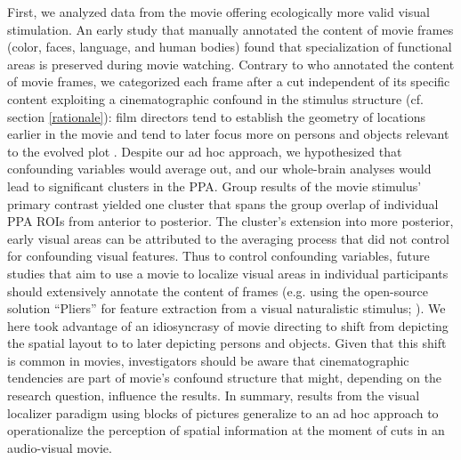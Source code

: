 \documentclass[english]{article}
\begin{document}
First, we analyzed data from the movie offering ecologically more valid visual
stimulation.
%
An early study \citep{bartels2004mapping} that manually annotated the content of
movie frames (color, faces, language, and human bodies) found that
specialization of functional areas is preserved during movie watching.
%
Contrary to \citep{bartels2004mapping} who annotated the content of movie
frames, we categorized each frame after a cut independent of its specific
content
exploiting a cinematographic confound in the stimulus structure (cf. section
\ref{rationale}):
film directors tend to establish the geometry of locations earlier in the movie
and tend to later focus more on persons and objects relevant to the evolved plot
\citep{brown2012cinematography, mercado2011filmmakers}.
Despite our ad hoc approach, we hypothesized that confounding variables would
average out, and our whole-brain analyses would lead to significant clusters in
the PPA.
Group results of the movie stimulus' primary contrast yielded one cluster that
spans the group overlap of individual PPA ROIs from anterior to posterior.
The cluster's extension into more posterior, early visual areas can be
attributed to the averaging process that did not control for confounding visual
features.
Thus to control confounding variables, future studies that aim to use a movie to
localize visual areas in individual participants should extensively annotate the
content of frames (e.g.  using the open-source solution ``Pliers'' for feature
extraction from a visual naturalistic stimulus; \citep{mcnamara2017developing}).
We here took advantage of an idiosyncrasy of movie directing to shift from
depicting the spatial layout to to later depicting persons and objects.
Given that this shift is common in movies, investigators should be aware that
cinematographic tendencies are part of movie's confound structure that might,
depending on the research question, influence the results.
In summary, results from the visual localizer paradigm using blocks of pictures
generalize to an ad hoc approach to operationalize the perception of spatial
information at the moment of cuts in an audio-visual movie.
\end{document}
